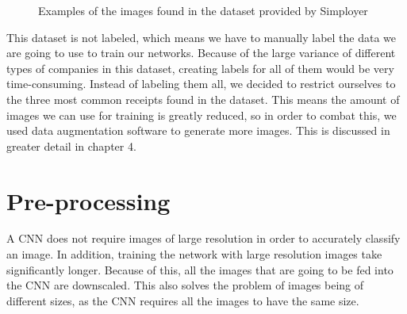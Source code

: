 \begin{figure}[h]
    \caption{Examples of the images found in the dataset provided by Simployer}
    \label{fig:figure3.2}
\end{figure}

This dataset is not labeled, which means we have to manually label the data we are going to use to train our networks.
Because of the large variance of different types of companies in this dataset, creating labels for all of them would be very time-consuming.
Instead of labeling them all, we decided to restrict ourselves to the three most common receipts found in the dataset.
This means the amount of images we can use for training is greatly reduced, so in order to combat this, we used data augmentation software to generate more images.
This is discussed in greater detail in chapter 4.

\section{Pre-processing}\label{sec:pre-processing}
A CNN does not require images of large resolution in order to accurately classify an image.
In addition, training the network with large resolution images take significantly longer.
Because of this, all the images that are going to be fed into the CNN are downscaled.
This also solves the problem of images being of different sizes, as the CNN requires all the images to have the same size.

